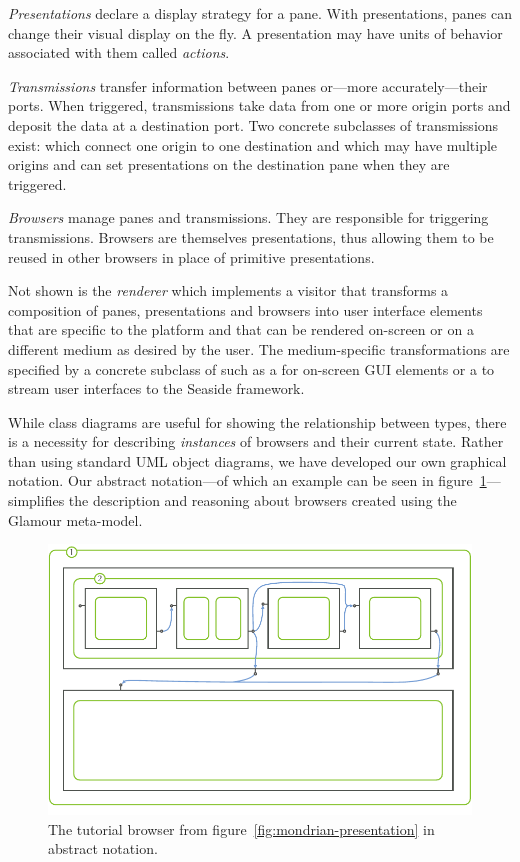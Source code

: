 \documentclass[a4paper,10pt,twoside]{book}
\begin{document}
\emph{Presentations} declare a display strategy for a pane. With
presentations, panes can change their visual display on the fly. A
presentation may have units of behavior associated with them called
\emph{actions}.

\emph{Transmissions} transfer information between panes or---more accurately---their ports. When triggered, transmissions take data from one or more origin ports and deposit the data at a destination port. Two concrete subclasses of transmissions exist:  which connect one origin to one destination and  which may have multiple origins and can set presentations on the destination pane when they are triggered.

\emph{Browsers} manage panes and transmissions. They are responsible for triggering transmissions. Browsers are themselves presentations, thus allowing them to be reused in other browsers in place of primitive presentations.

Not shown is the \emph{renderer} which implements a visitor that
transforms a composition of panes, presentations and browsers into
user interface elements that are specific to the platform and that can
be rendered on-screen or on a different medium as desired by the
user. The medium-specific transformations are specified by a concrete
subclass of  such as a  for
on-screen GUI elements or a  to stream user interfaces
to the Seaside framework.

While class diagrams are useful for showing the relationship between
types, there is a necessity for describing \emph{instances} of
browsers and their current state. Rather than using standard UML
object diagrams, we have developed our own graphical notation. Our
abstract notation---of which an example can be seen in
figure~\ref{fig:schematic-browser}---simplifies the description and
reasoning about browsers created using the Glamour meta-model.

\begin{figure}[htbp]
\centerline{\includegraphics[width=\linewidth]{schematic_browser.pdf}}
\caption{The tutorial browser from figure~\ref{fig:mondrian-presentation} in abstract notation.}
\label{fig:schematic-browser}
\end{figure}
\end{document}
